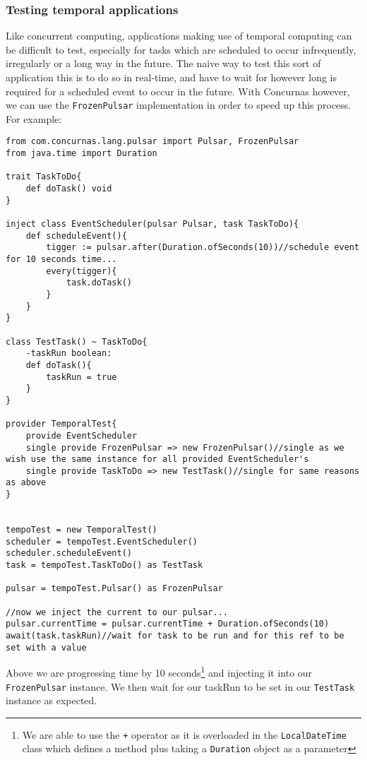 \documentclass[conc-doc]{subfiles}
\begin{document}
\subsubsection{Testing temporal applications}
Like concurrent computing, applications making use of temporal computing can be difficult to test, especially for tasks which are scheduled to occur infrequently, irregularly or a long way in the future. The naive way to test this sort of application this is to do so in real-time, and have to wait for however long is required for a scheduled event to occur in the future. With Concurnas however, we can use the \lstinline{FrozenPulsar} implementation in order to speed up this process. For example:


\begin{lstlisting}
from com.concurnas.lang.pulsar import Pulsar, FrozenPulsar
from java.time import Duration

trait TaskToDo{
	def doTask() void
}

inject class EventScheduler(pulsar Pulsar, task TaskToDo){
	def scheduleEvent(){
		tigger := pulsar.after(Duration.ofSeconds(10))//schedule event for 10 seconds time...
		every(tigger){
			task.doTask()
		}
	}
}

class TestTask() ~ TaskToDo{
	-taskRun boolean:
	def doTask(){
		taskRun = true
	}
}

provider TemporalTest{
	provide EventScheduler
	single provide FrozenPulsar => new FrozenPulsar()//single as we wish use the same instance for all provided EventScheduler's
	single provide TaskToDo => new TestTask()//single for same reasons as above
}


tempoTest = new TemporalTest()
scheduler = tempoTest.EventScheduler()
scheduler.scheduleEvent()
task = tempoTest.TaskToDo() as TestTask

pulsar = tempoTest.Pulsar() as FrozenPulsar

//now we inject the current to our pulsar...
pulsar.currentTime = pulsar.currentTime + Duration.ofSeconds(10)
await(task.taskRun)//wait for task to be run and for this ref to be set with a value
\end{lstlisting}

Above we are progressing time by 10 seconds\footnote{We are able to use the \lstinline{+} operator as it is overloaded in the \lstinline{LocalDateTime} class which defines a method plus taking a \lstinline{Duration} object as a parameter} and injecting it into our \lstinline{FrozenPulsar} instance. We then wait for our taskRun to be set in our \lstinline{TestTask} instance as expected.
\end{document}
